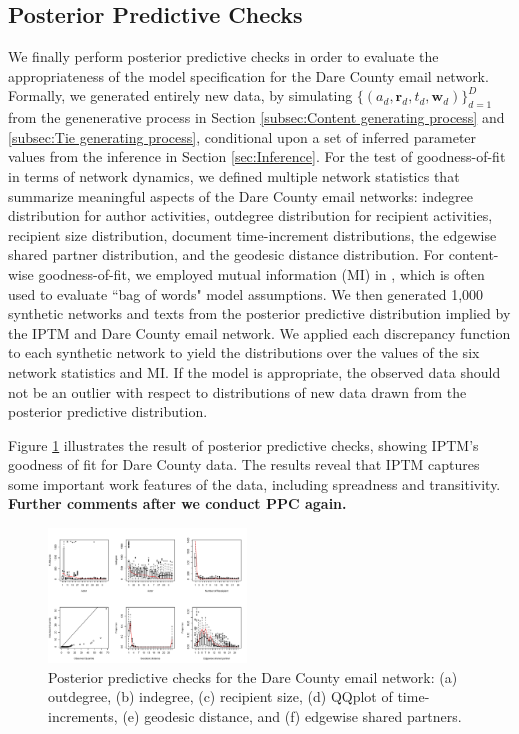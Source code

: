 \documentclass[twoside]{article}
\begin{document}
\subsection{Posterior Predictive Checks}
We finally perform posterior predictive checks \cite{rubin1984bayesianly} in order to evaluate the appropriateness of the model specification for the Dare County email network. Formally, we generated entirely new data, by simulating $\{(a_{d}, \boldsymbol{r}_{d}, t_{d}, \boldsymbol{w}_{d})\}_{d=1}^D$ from the genenerative process in Section \ref{subsec:Content generating process} and \ref{subsec:Tie generating process}, conditional upon a set of inferred parameter values from the inference in Section \ref{sec:Inference}. For the test of goodness-of-fit in terms of network dynamics, we defined multiple network statistics that summarize meaningful aspects of the Dare County email networks: indegree distribution for author activities, outdegree distribution for recipient activities, recipient size distribution, document time-increment distributions, the edgewise shared partner distribution, and the geodesic distance distribution. For content-wise goodness-of-fit, we employed mutual information (MI) in \cite{mimno2011bayesian}, which is often used to evaluate ``bag of words" model assumptions. We then generated 1,000 synthetic networks and texts from the posterior predictive distribution implied by the IPTM and Dare County email network.
We applied each discrepancy function to each synthetic network to yield the distributions over the values of the six network statistics and MI. If the model is appropriate, the observed data should not be an outlier with respect to distributions of new data drawn from the posterior predictive distribution. 

Figure \ref{fig:PPC} illustrates the result of posterior predictive checks, showing IPTM's goodness of fit for Dare County data. The results reveal that IPTM captures some important work features of the data, including spreadness and transitivity. \textbf{Further comments after we conduct PPC again.}
	\begin{figure}[h]
		\centering
		\includegraphics[width = 0.47\textwidth]{plots/PPC_plot.pdf}
		\caption{Posterior predictive checks for the Dare County email network: (a) outdegree, (b) indegree, (c) recipient size, (d) QQplot of time-increments, (e) geodesic distance, and (f) edgewise shared partners.}
		\label{fig:PPC}
	\end{figure}
\end{document}

